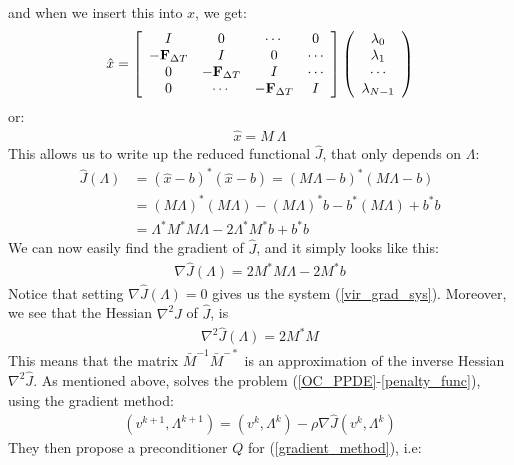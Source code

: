 \documentclass[11pt,a4paper]{article}
\begin{document}
and when we insert this into $x$, we get:
\begin{align}
\hat{x} = \left[ \begin{array}{cccc}
   I & 0 & \cdots & 0 \\  
   -\bold{F}_{\Delta T} & I & 0 & \cdots \\ 
   0 &-\bold{F}_{\Delta T} & I  & \cdots \\
   0 &\cdots &-\bold{F}_{\Delta T} & I   \\
   \end{array}  \right]
   \left( \begin{array}{c}
   \lambda_0 \\  
   \lambda_1 \\ 
   \cdots  \\
   \lambda_{N-1}  \\
   \end{array}  \right)
\end{align}
or:
\begin{align}
\hat{x} = M \ \Lambda
\end{align}
This allows us to write up the reduced functional $\hat{J}$, that only depends on $\Lambda$:
\begin{align*}
\hat{J}(\Lambda)&= (\hat{x}-b)^*(\hat{x}-b) =
(M  \Lambda -b)^*(M  \Lambda -b) \\
&= (M  \Lambda)^*(M  \Lambda) - (M  \Lambda)^*b-b^*(M  \Lambda) + b^*b \\
&=\Lambda^*M^*M  \Lambda - 2\Lambda^*M^*b + b^*b
\end{align*}
We can now easily find the gradient of $\hat{J}$, and it simply looks like this:
\begin{align*}
\nabla\hat{J}(\Lambda) = 2 M^*M\Lambda - 2M^*b
\end{align*}
Notice that setting $\nabla\hat{J}(\Lambda)=0$ gives us the system (\ref{vir_grad_sys}). Moreover, we see that the Hessian $\nabla^2 \hat{J}$ of $\hat{J}$, is
\begin{align}
\nabla^2 \hat{J}(\Lambda) = 2 M^*M
\end{align}
This means that the matrix $\bar{M}^{-1}\bar{M}^{-*}$ is an approximation of the inverse Hessian $\nabla^2 \hat{J}$. As mentioned above, \cite{maday2002parareal} solves the problem (\ref{OC_PPDE}-\ref{penalty_func}), using the gradient method:
\begin{align}
(v^{k+1},\Lambda^{k+1}) = (v^{k},\Lambda^{k}) -\rho\nabla\hat{J}(v^{k},\Lambda^{k}) \label{gradient_method}
\end{align}
They then propose a preconditioner $Q$ for (\ref{gradient_method}), i.e:
\end{document}
